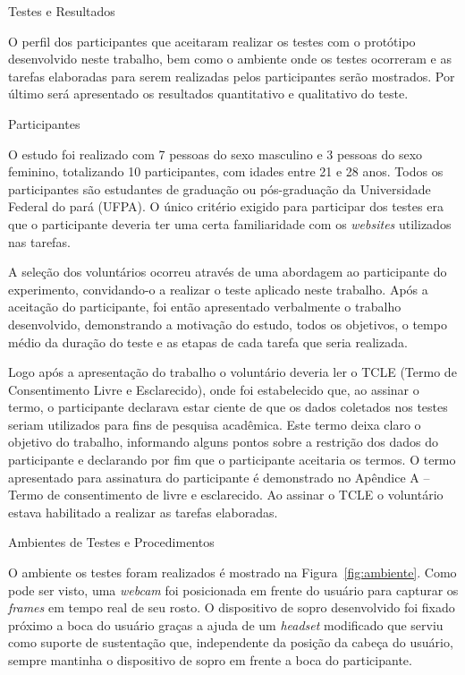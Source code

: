 \begin{chapter}{Testes e Resultados}

O perfil dos participantes que aceitaram realizar os testes com o protótipo
desenvolvido neste trabalho, bem como o ambiente onde os testes ocorreram e as 
tarefas elaboradas para serem realizadas pelos participantes serão mostrados.
Por último será apresentado os resultados quantitativo e qualitativo do teste.  

\begin{section}{Participantes}

O estudo foi realizado com 7 pessoas do sexo masculino e 3 pessoas do sexo
feminino, totalizando 10 participantes, com idades entre 21 e 28 anos.
Todos os participantes são estudantes de graduação ou pós-graduação da
Universidade Federal do pará (UFPA). O único critério exigido para participar
dos testes era que o participante deveria ter uma certa familiaridade com os
\textit{websites} utilizados nas tarefas.  

A seleção dos voluntários ocorreu através de uma abordagem ao participante do
experimento, convidando-o a realizar o teste aplicado neste trabalho. Após a
aceitação do participante, foi então apresentado verbalmente o trabalho
desenvolvido, demonstrando a motivação do estudo, todos os objetivos, o tempo
médio da duração do teste e  as etapas de cada tarefa que seria realizada. 
 
Logo após a apresentação do trabalho o voluntário deveria ler o TCLE (Termo de
Consentimento Livre e Esclarecido), onde foi estabelecido que, ao assinar o
termo, o participante declarava estar ciente de que os dados coletados nos
testes seriam utilizados para fins de pesquisa acadêmica. Este termo deixa
claro o objetivo do trabalho, informando alguns pontos sobre a restrição dos
dados do participante e declarando por fim que o participante aceitaria os
termos. O termo apresentado para assinatura do participante é demonstrado no
Apêndice A – Termo de consentimento de livre e esclarecido. Ao assinar o TCLE o
voluntário estava habilitado a realizar as tarefas elaboradas. 
\end{section}

\begin{section}{Ambientes de Testes e Procedimentos}

O ambiente os testes foram realizados é mostrado na Figura~\ref{fig:ambiente}.
Como pode ser visto, uma \textit{webcam} foi posicionada em frente do usuário
para capturar os \textit{frames} em tempo real de seu rosto. O dispositivo de
sopro desenvolvido foi fixado próximo a boca do usuário graças a ajuda de um
\textit{headset} modificado que serviu como suporte de sustentação que,
independente da posição da cabeça do usuário, sempre mantinha o dispositivo de
sopro em frente a boca do participante.


\end{section}
\end{chapter}
